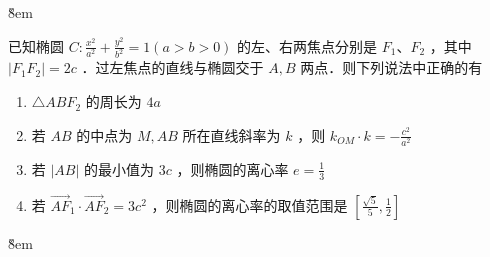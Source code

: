 \v{8em}

\begin{problem}
已知椭圆 $C: \frac{x^2}{a^2}+\frac{y^2}{b^2}=1(a>b>0)$ 的左、右两焦点分别是 $F_1 、 F_2$ ，其中 $\left|F_1 F_2\right|=2 c$ ．过左焦点的直线与椭圆交于 $A, B$ 两点．则下列说法中正确的有
\begin{enumerate}
    \item $\triangle A B F_2$ 的周长为 $4 a$
    \item 若 $A B$ 的中点为 $M, A B$ 所在直线斜率为 $k$ ，则 $k_{O M} \cdot k=-\frac{c^2}{a^2}$
    \item 若 $|A B|$ 的最小值为 $3 c$ ，则椭圆的离心率 $e=\frac{1}{3}$
    \item 若 $\overrightarrow{A F}_1 \cdot \overrightarrow{A F}_2=3 c^2$ ，则椭圆的离心率的取值范围是 $\left[\frac{\sqrt{5}}{5}, \frac{1}{2}\right]$
\end{enumerate}
\end{problem}

\v{8em}
